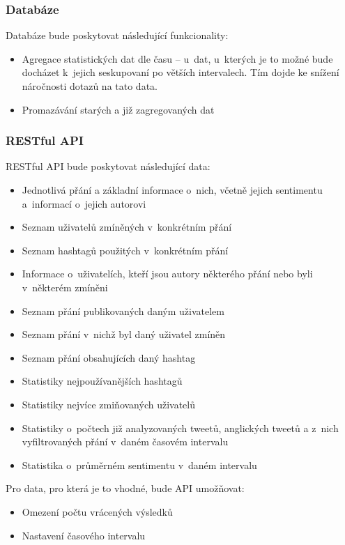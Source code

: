 \documentclass[thesis=B,czech]{FITthesis}[2012/06/26]
\begin{document}
\subsubsection{Databáze}
 Databáze bude poskytovat následující funkcionality:
\begin{itemize}
\item Agregace statistických dat dle času -- u~dat, u~kterých je to možné bude docházet k~jejich seskupovaní po větších intervalech. Tím dojde ke snížení náročnosti dotazů na tato data. 
\item Promazávání starých a již zagregovaných dat
\end{itemize}
\subsubsection{RESTful API}
RESTful API bude poskytovat následující data:

\begin{itemize}
\item Jednotlivá přání a základní informace o~nich, včetně jejich sentimentu a~informací o~jejich autorovi
\item Seznam uživatelů zmíněných v~konkrétním přání
\item Seznam hashtagů použitých v~konkrétním přání
\item Informace o~uživatelích, kteří jsou autory některého přání nebo byli v~některém zmíněni
\item Seznam přání publikovaných daným uživatelem
\item Seznam přání v~nichž byl daný uživatel zmíněn
\item Seznam přání obsahujících daný hashtag
\item Statistiky nejpoužívanějších hashtagů
\item Statistiky nejvíce zmiňovaných uživatelů
\item Statistiky o~počtech již analyzovaných tweetů, anglických tweetů a z~nich vyfiltrovaných přání v~daném časovém intervalu
\item Statistika o~průměrném sentimentu v~daném intervalu
\end{itemize}

\noindent Pro data, pro která je to vhodné, bude API umožňovat:
\begin{itemize}
\item Omezení počtu vrácených výsledků
\item Nastavení časového intervalu
\end{itemize}
\end{document}
